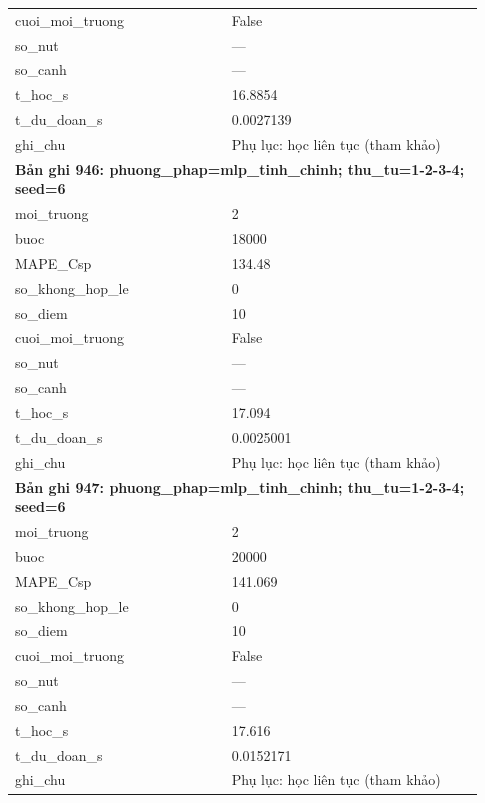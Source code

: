 \begin{longtable}{p{0.43\linewidth}p{0.50\linewidth}}
cuoi\_\allowbreak moi\_\allowbreak truong & False \\
so\_\allowbreak nut & — \\
so\_\allowbreak canh & — \\
t\_\allowbreak hoc\_\allowbreak s & 16.8854 \\
t\_\allowbreak du\_\allowbreak doan\_\allowbreak s & 0.0027139 \\
ghi\_\allowbreak chu & Phụ lục: học liên tục (tham khảo) \\
\midrule
\multicolumn{2}{p{0.95\linewidth}}{\textbf{Bản ghi 946: phuong\_phap=mlp\_tinh\_chinh; thu\_tu=1-2-3-4; seed=6}} \\
moi\_\allowbreak truong & 2 \\
buoc & 18000 \\
MAPE\_\allowbreak Csp & 134.48 \\
so\_\allowbreak khong\_\allowbreak hop\_\allowbreak le & 0 \\
so\_\allowbreak diem & 10 \\
cuoi\_\allowbreak moi\_\allowbreak truong & False \\
so\_\allowbreak nut & — \\
so\_\allowbreak canh & — \\
t\_\allowbreak hoc\_\allowbreak s & 17.094 \\
t\_\allowbreak du\_\allowbreak doan\_\allowbreak s & 0.0025001 \\
ghi\_\allowbreak chu & Phụ lục: học liên tục (tham khảo) \\
\midrule
\multicolumn{2}{p{0.95\linewidth}}{\textbf{Bản ghi 947: phuong\_phap=mlp\_tinh\_chinh; thu\_tu=1-2-3-4; seed=6}} \\
moi\_\allowbreak truong & 2 \\
buoc & 20000 \\
MAPE\_\allowbreak Csp & 141.069 \\
so\_\allowbreak khong\_\allowbreak hop\_\allowbreak le & 0 \\
so\_\allowbreak diem & 10 \\
cuoi\_\allowbreak moi\_\allowbreak truong & False \\
so\_\allowbreak nut & — \\
so\_\allowbreak canh & — \\
t\_\allowbreak hoc\_\allowbreak s & 17.616 \\
t\_\allowbreak du\_\allowbreak doan\_\allowbreak s & 0.0152171 \\
ghi\_\allowbreak chu & Phụ lục: học liên tục (tham khảo) \\

\end{longtable}
